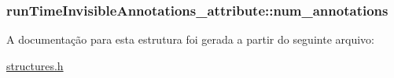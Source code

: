 \subsubsection[{\texorpdfstring{num\+\_\+annotations}{num_annotations}}]{ run\+Time\+Invisible\+Annotations\+\_\+attribute\+::num\+\_\+annotations}\hypertarget{structrunTimeInvisibleAnnotations__attribute_a703d15c7112b673ff31b7e4b2d85782b}{}\label{structrunTimeInvisibleAnnotations__attribute_a703d15c7112b673ff31b7e4b2d85782b}


A documentação para esta estrutura foi gerada a partir do seguinte arquivo\+:\begin{DoxyCompactItemize}
\item 
\hyperlink{structures_8h}{structures.\+h}\end{DoxyCompactItemize}
